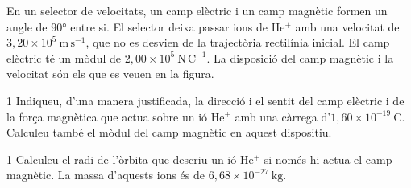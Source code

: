 En un selector de velocitats, un camp elèctric i un camp magnètic formen un angle de 90° entre si. El selector deixa passar ions de He$^{+}$ amb una velocitat de $3,20\times 10^{5}\ \mathrm{m\,s^{-1}}$, que no es desvien de la trajectòria rectilínia inicial. El camp elèctric té un mòdul de $2,00\times 10^{5}\ \mathrm{N\,C^{-1}}$. La disposició del camp magnètic i la velocitat són els que es veuen en la figura.


\begin{apartat}{1}
Indiqueu, d'una manera justificada, la direcció i el sentit del camp elèctric i de la força magnètica que actua sobre un ió He$^{+}$ amb una càrrega d'$1,60\times 10^{-19}\ \mathrm{C}$. Calculeu també el mòdul del camp magnètic en aquest dispositiu.
\end{apartat}

\begin{apartat}{1}
Calculeu el radi de l'òrbita que descriu un ió He$^{+}$ si només hi actua el camp magnètic. La massa d'aquests ions és de $6,68\times 10^{-27}\ \mathrm{kg}$.
\end{apartat}
